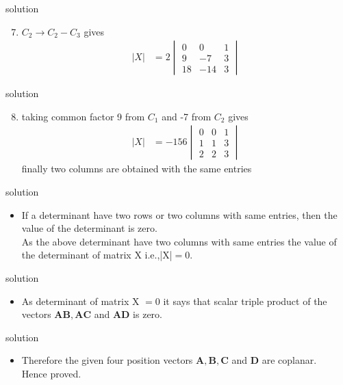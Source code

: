 \documentclass{beamer}
\let\vec\mathbf
\begin{document}
\begin{frame}{solution}
\begin{enumerate}
\setcounter{enumi}{6}
\item $C_2\longrightarrow C_2-C_3$ gives
\begin{align}
       |X| & = 2\begin{vmatrix}
               0 & 0 & 1\\
               9 & -7 & 3\\
               18 & -14 & 3
               \end{vmatrix}
\end{align}
\end{enumerate}
\end{frame}


\begin{frame}{solution}
\begin{enumerate}
\setcounter{enumi}{7}
\item 
    taking common factor 9 from $C_1$ and -7 from $C_2$ gives
\begin{align}
       |X| & = -156\begin{vmatrix}
               0 & 0 & 1\\
               1 & 1 & 3\\
               2 & 2 & 3
              \end{vmatrix}
\end{align}
finally two columns are obtained with the same entries
\end{enumerate}
\end{frame}


\begin{frame}{solution}
\begin{itemize}
    \item If a determinant have two rows or two columns with same entries, then the value of the determinant is zero.\\
    As the above determinant have two columns with same entries the value of the determinant of matrix X i.e.,|X|$=0$.
\end{itemize}
\end{frame}

\begin{frame}{solution}
 \begin{itemize}
 \item
    As determinant of matrix X $ = 0$ it says that scalar triple product of the vectors $\vec{AB},\vec{AC}$ and $\vec{AD}$ is zero.
 \end{itemize}
 \end{frame}
 
 
 \begin{frame}{solution}
 \begin{itemize}
\item Therefore the given four position vectors $\vec{A},\vec{B},\vec{C}$ and $\vec{D}$ are coplanar.\\
     Hence proved.
 \end{itemize}
 \end{frame}
 
 
\end{document}
